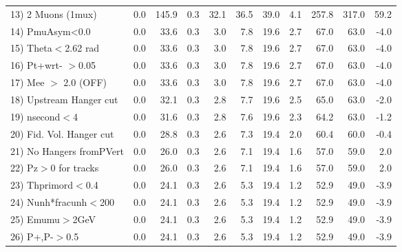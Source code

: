\begin{table}[h!]
{{\begin{tabular}{||l||r|r|r|r|r|r|r||r||r||r||}
 13) 2 Muons (1mux)       &       0.0 &     145.9 &       0.3 &      32.1 &      36.5 &      39.0 &       4.1 &     257.8 &     317.0 &      59.2 \\
 14) PmuAsym<0.0          &       0.0 &      33.6 &       0.3 &       3.0 &       7.8 &      19.6 &       2.7 &      67.0 &      63.0 &      -4.0 \\
 15) Theta$<$2.62 rad     &       0.0 &      33.6 &       0.3 &       3.0 &       7.8 &      19.6 &       2.7 &      67.0 &      63.0 &      -4.0 \\
 16) Pt+wrt- $>$0.05      &       0.0 &      33.6 &       0.3 &       3.0 &       7.8 &      19.6 &       2.7 &      67.0 &      63.0 &      -4.0 \\
 17) Mee $>$ 2.0  (OFF)   &       0.0 &      33.6 &       0.3 &       3.0 &       7.8 &      19.6 &       2.7 &      67.0 &      63.0 &      -4.0 \\
 18) Upstream Hanger cut  &       0.0 &      32.1 &       0.3 &       2.8 &       7.7 &      19.6 &       2.5 &      65.0 &      63.0 &      -2.0 \\
 19) nsecond$<$4          &       0.0 &      31.6 &       0.3 &       2.8 &       7.6 &      19.6 &       2.3 &      64.2 &      63.0 &      -1.2 \\
 20) Fid. Vol. Hanger cut &       0.0 &      28.8 &       0.3 &       2.6 &       7.3 &      19.4 &       2.0 &      60.4 &      60.0 &      -0.4 \\
 21) No Hangers fromPVert &       0.0 &      26.0 &       0.3 &       2.6 &       7.1 &      19.4 &       1.6 &      57.0 &      59.0 &       2.0 \\
 22) Pz$>$0 for tracks    &       0.0 &      26.0 &       0.3 &       2.6 &       7.1 &      19.4 &       1.6 &      57.0 &      59.0 &       2.0 \\
 23) Thprimord$<$0.4      &       0.0 &      24.1 &       0.3 &       2.6 &       5.3 &      19.4 &       1.2 &      52.9 &      49.0 &      -3.9 \\
 24) Nunh*fracunh$<$200   &       0.0 &      24.1 &       0.3 &       2.6 &       5.3 &      19.4 &       1.2 &      52.9 &      49.0 &      -3.9 \\
 25) Emumu$>$2GeV         &       0.0 &      24.1 &       0.3 &       2.6 &       5.3 &      19.4 &       1.2 &      52.9 &      49.0 &      -3.9 \\
 26) P+,P-$>$0.5          &       0.0 &      24.1 &       0.3 &       2.6 &       5.3 &      19.4 &       1.2 &      52.9 &      49.0 &      -3.9 \\

\end{tabular}}}
\end{table}
